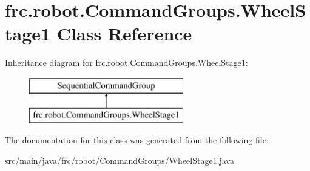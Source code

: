 \hypertarget{classfrc_1_1robot_1_1_command_groups_1_1_wheel_stage1}{}\section{frc.\+robot.\+Command\+Groups.\+Wheel\+Stage1 Class Reference}
\label{classfrc_1_1robot_1_1_command_groups_1_1_wheel_stage1}
Inheritance diagram for frc.\+robot.\+Command\+Groups.\+Wheel\+Stage1\+:\begin{figure}[H]
\begin{center}
\leavevmode
\includegraphics[height=2.000000cm]{classfrc_1_1robot_1_1_command_groups_1_1_wheel_stage1}
\end{center}
\end{figure}


The documentation for this class was generated from the following file\+:\begin{DoxyCompactItemize}
\item 
src/main/java/frc/robot/\+Command\+Groups/Wheel\+Stage1.\+java\end{DoxyCompactItemize}

